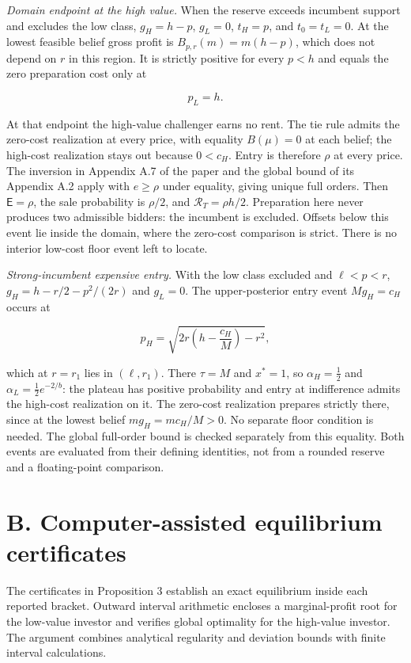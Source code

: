 \documentclass[
  11pt,
]{article}
\begin{document}
\emph{Domain endpoint at the high value.} When the reserve exceeds incumbent support
and excludes the low class, \(g_H=h-p\), \(g_L=0\), \(t_H=p\), and
\(t_0=t_L=0\). At the lowest feasible belief gross profit is \(B_{p,r}(m)=m(h-p)\), which does not
depend on \(r\) in this region.
It is strictly positive for every \(p<h\) and equals the zero preparation cost only at

\[
p_L=h.
\]

At that endpoint the high-value challenger earns no rent. The tie rule admits
the zero-cost realization at every price, with equality \(B(\mu)=0\) at each
belief; the high-cost realization stays out because \(0<c_H\).
Entry is therefore \(\rho\) at every price. The inversion in Appendix A.7 of the paper and the global
bound of its Appendix A.2 apply with \(e\ge\rho\) under
equality, giving unique full orders. Then \(\mathsf E=\rho\), the sale
probability is \(\rho/2\), and \(\mathcal R_T=\rho h/2\). Preparation
here never produces two admissible bidders: the incumbent is excluded.
Offsets below this event lie inside the domain, where the zero-cost
comparison is strict. There is no interior low-cost floor event left
to locate.

\emph{Strong-incumbent expensive entry.} With the low class excluded and
\(\ell<p<r\), \(g_H=h-r/2-p^2/(2r)\) and \(g_L=0\). The upper-posterior
entry event \(Mg_H=c_H\) occurs at

\[
p_H=\sqrt{2r\left(h-\frac{c_H}{M}\right)-r^2},
\]

which at \(r=r_1\) lies in \((\ell,r_1)\). There \(\tau=M\) and
\(x^*=1\), so \(\alpha_H=\tfrac12\) and \(\alpha_L=\tfrac12e^{-2/b}\):
the plateau has positive probability and entry at indifference admits
the high-cost realization on it. The zero-cost realization prepares strictly there,
since at the lowest belief \(mg_H=mc_H/M>0\). No separate floor condition
is needed. The global full-order bound is checked
separately from this equality. Both events are evaluated from their
defining identities, not from a rounded reserve and a floating-point
comparison.

\section{B. Computer-assisted equilibrium certificates}\label{oa-b}

The certificates in Proposition 3 establish an exact equilibrium inside
each reported bracket. Outward interval arithmetic encloses a
marginal-profit root for the low-value investor and verifies global
optimality for the high-value investor. The argument combines analytical
regularity and deviation bounds with finite interval calculations.
\end{document}
